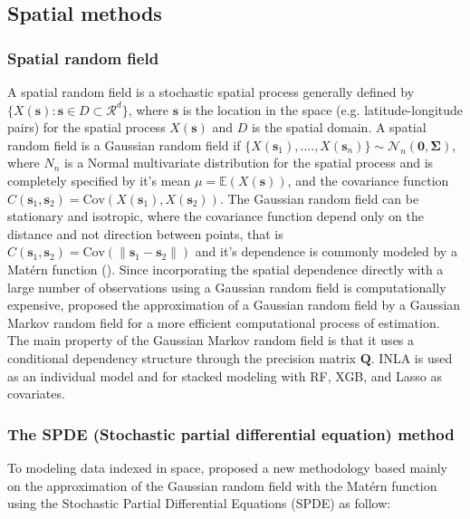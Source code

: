 \documentclass{article}
\begin{document}
\subsection{Spatial methods}

\subsubsection{Spatial random field}
A spatial random field is a stochastic spatial process generally defined by $\{X(\boldsymbol{s}): \boldsymbol{s} \in D \subset \mathcal{R}^{d}\}$, where $\boldsymbol{s}$ is the location in the space (e.g. latitude-longitude pairs) for the spatial process $X(\boldsymbol{s})$ and $D$ is the spatial domain. A spatial random field is a Gaussian random field if $\{X(\boldsymbol{s}_{1}),...., X(\boldsymbol{s}_{n})\} \sim \mathcal{N}_{n}(\boldsymbol{0}, \boldsymbol{\Sigma})$, where $N_{n}$ is a Normal multivariate distribution for the spatial process and is completely specified by it's mean $\mu = \mathbb{E}(X(\boldsymbol{s}))$, and the covariance function $C(\boldsymbol{s}_{1}, \boldsymbol{s}_{2}) = \text{Cov}(X(\boldsymbol{s}_{1}), X(\boldsymbol{s}_{2}))$. The Gaussian random field can be stationary and isotropic, where the covariance function depend only on the distance and not direction between points, that is $C(\boldsymbol{s}_{1}, \boldsymbol{s}_{2}) = \text{Cov}(\|\boldsymbol{s}_{1} - \boldsymbol{s}_{2}\|)$ and it's dependence is commonly modeled by a Matérn function (\cite{stein2012interpolation}\cite{yuan2011models}). Since incorporating the spatial dependence directly with a large number of observations using a Gaussian random field is computationally expensive, \cite{rue2005gaussian} proposed the approximation of a Gaussian random field by a Gaussian Markov random field for a more efficient computational process of estimation. The main property of the Gaussian Markov random field is that it uses a conditional dependency structure through the precision matrix $\boldsymbol{Q}$. INLA is used as an individual model and for stacked modeling with RF, XGB, and Lasso as covariates. 


\subsubsection{The SPDE (Stochastic partial differential equation) method}

To modeling data indexed in space, \cite{lindgren2011explicit} proposed a new methodology based mainly on the approximation of the Gaussian random field with the Matérn function using the Stochastic Partial Differential Equations (SPDE) as follow:
\end{document}
